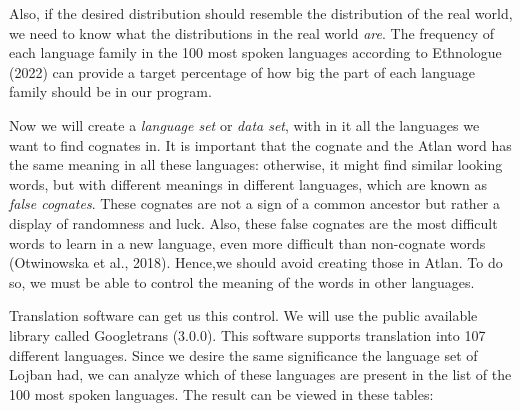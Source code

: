Also, if the desired distribution should resemble the distribution of the real world, we need to know what the distributions in the real world \textit{are}. The frequency of each language family in the 100 most spoken languages according to Ethnologue (2022) can provide a target percentage of how big the part of each language family should be in our program.  

Now we will create a \textit{language set} or \textit{data set}, with in it all the languages we want to find cognates in. It is important that the cognate and the Atlan word has the same meaning in all these languages: otherwise, it might find similar looking words, but with different meanings in different languages, which are known as \textit{false cognates}. These cognates are not a sign of a common ancestor but rather a display of randomness and luck. Also, these false cognates are the most difficult words to learn in a new language, even more difficult than non-cognate words (Otwinowska et al., 2018). Hence,we should avoid creating those in Atlan. To do so, we must be able to control the meaning of the words in other languages. 

Translation software can get us this control. We will use the public available library called Googletrans (3.0.0). This software supports translation into 107 different languages. Since we desire the same significance the language set of Lojban had, we can analyze which of these languages are present in the list of the 100 most spoken languages. The result can be viewed in these tables: 

\setcounter{tablecount}{1}


